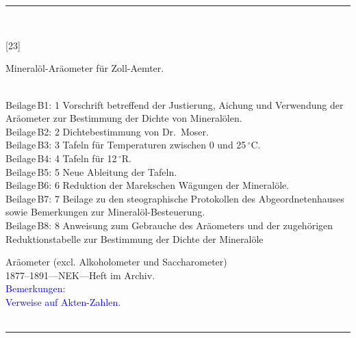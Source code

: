 \\
\vspace*{-2.5pt}\\
\parbox{\textwidth}{%
\rule{\textwidth}{1pt}\vspace*{-3mm}\\
\begin{minipage}[t]{0.15\textwidth}\vspace{0pt}
\Huge\rule[-4mm]{0cm}{1cm}[23]
\end{minipage}
\hfill
\begin{minipage}[t]{0.85\textwidth}\vspace{0pt}
\large Mineralöl-Aräometer für Zoll-Aemter.\rule[-2mm]{0mm}{2mm}
{\footnotesize \\{}
Beilage\,B1: 1 Vorschrift betreffend der Justierung, Aichung und Verwendung der Aräometer zur Bestimmung der Dichte von Mineralölen.\\
Beilage\,B2: 2 Dichtebestimmung von Dr.~Moser.\\
Beilage\,B3: 3 Tafeln für Temperaturen zwischen 0 und 25\,{$^\circ$}C.\\
Beilage\,B4: 4 Tafeln für 12\,{$^\circ$}R.\\
Beilage\,B5: 5 Neue Ableitung der Tafeln.\\
Beilage\,B6: 6 Reduktion der Marekschen Wägungen der Mineralöle.\\
Beilage\,B7: 7 Beilage zu den steographische Protokollen des Abgeordnetenhauses sowie Bemerkungen zur Mineralöl-Besteuerung.\\
Beilage\,B8: 8 Anweisung zum Gebrauche des Aräometers und der zugehörigen Reduktionstabelle zur Bestimmung der Dichte der Mineralöle\\
}
\end{minipage}
{\footnotesize\flushright
Aräometer (excl. Alkoholometer und Saccharometer)\\
}
1877--1891\quad---\quad NEK\quad---\quad Heft im Archiv.\\
\textcolor{blue}{Bemerkungen:\\{}
Verweise auf Akten-Zahlen.\\{}
}
\\[-15pt]
\rule{\textwidth}{1pt}
}
\\
\vspace*{-2.5pt}\\
